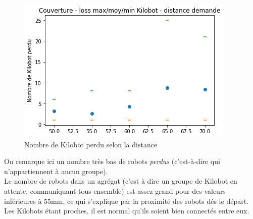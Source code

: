 \documentclass[a4paper]{article}
\begin{document}
\begin{figure}[h!]
	\centering
	\begin{minipage}[c]{.46\linewidth}
		\centering
		\includegraphics[width=1.1\linewidth]{../../script_results/Couverture_loss_kilobot_groupe.png}
		\caption{Nombre de Kilobot perdu selon la distance}
	\end{minipage}
\end{figure}
On remarque ici un nombre très bas de robots \textit{perdus} (c'est-à-dire qui n'appartiennent à aucun groupe). \\Le nombre de robots dans un agrégat (c'est à dire un groupe de Kilobot en attente, communiquant tous ensemble) est assez grand pour des valeurs inférieures à 55mm, ce qui s'explique par la proximité des robots dés le départ. Les Kilobots étant proches, il est normal qu'ils soient bien connectés entre eux.
\end{document}
